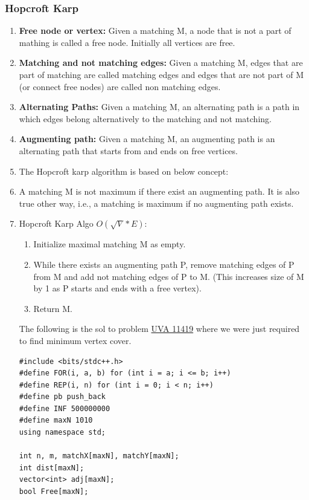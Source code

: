 \documentclass[8pt, a4paper, oneside, twocolumn]{extarticle}
\begin{document}
\subsubsection{Hopcroft Karp}
\begin{enumerate}
    \item \textbf{Free node or vertex: }Given a matching M, a node that is not a part of mathing is called a free node. Initially all vertices are free.
    \item \textbf{Matching and not matching edges: }Given a matching M, edges that are part of matching are called matching edges and edges that are not part of M (or connect free nodes) are called non matching edges.
    \item \textbf{Alternating Paths: }Given a matching M, an alternating path is a path in which edges belong alternatively to the matching and not matching.
    \item \textbf{Augmenting path: }Given a matching M, an augmenting path is an alternating path that starts from and ends on free vertices.
    \item The Hopcroft karp algorithm is based on below concept:
    \item A matching M is not maximum if there exist an augmenting path. It is also true other way, i.e., a matching is maximum if no augmenting path exists.
    \item Hopcroft Karp Algo $O(\sqrt{V}*E)$: 
    \begin{enumerate}
        \item Initialize maximal matching M as empty.
        \item While there exists an augmenting path P, remove matching edges of P from M and add not matching edges of P to M. (This increases size of M by 1 as P starts and ends with a free vertex).
        \item Return M.
    \end{enumerate}
The following is the sol to problem \href {https://uva.onlinejudge.org/external/114/11419.pdf}{UVA 11419} where we were just required to find minimum vertex cover.
    \begin{verbatim}
#include <bits/stdc++.h>
#define FOR(i, a, b) for (int i = a; i <= b; i++)
#define REP(i, n) for (int i = 0; i < n; i++)
#define pb push_back
#define INF 500000000
#define maxN 1010
using namespace std;

int n, m, matchX[maxN], matchY[maxN];
int dist[maxN];
vector<int> adj[maxN];
bool Free[maxN];


\end{verbatim}
\end{enumerate}
\end{document}
